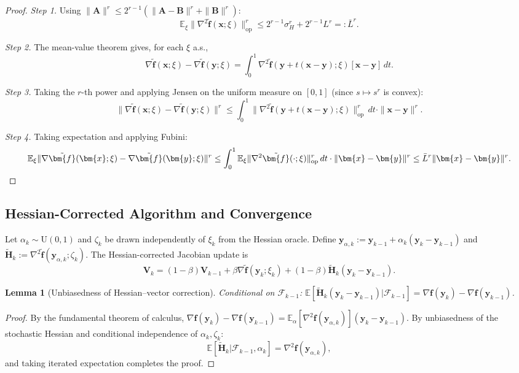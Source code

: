 \documentclass{article}
\def\vf{{\bm{f}}}
\def\vx{{\bm{x}}}
\def\vy{{\bm{y}}}
\def\vA{{\bm{A}}}
\def\vB{{\bm{B}}}
\def\mH{{\bm{H}}}
\def\mV{{\bm{V}}}
\newcommand{\E}{\mathbb{E}}
\newtheorem{lemma}{Lemma}
\begin{document}
\begin{proof}
\emph{Step 1.} Using $\|\vA\|^r \le 2^{r-1}(\|\vA - \vB\|^r + \|\vB\|^r)$:
\[
\E_\xi\|\nabla^2\tilde\vf(\vx; \xi)\|_{\mathrm{op}}^r \le 2^{r-1}\sigma_H^r + 2^{r-1} L^r =: \bar L^r.
\]

\emph{Step 2.} The mean-value theorem gives, for each $\xi$ a.s.,
\[
\nabla\tilde\vf(\vx;\xi) - \nabla\tilde\vf(\vy;\xi) = \int_0^1 \nabla^2\tilde\vf(\vy + t(\vx - \vy); \xi)[\vx - \vy]\,dt.
\]

\emph{Step 3.} Taking the $r$-th power and applying Jensen on the uniform measure on $[0,1]$ (since $s \mapsto s^r$ is convex):
\[
\|\nabla\tilde\vf(\vx;\xi) - \nabla\tilde\vf(\vy;\xi)\|^r \le \int_0^1 \|\nabla^2\tilde\vf(\vy + t(\vx - \vy); \xi)\|_{\mathrm{op}}^r\,dt \cdot \|\vx - \vy\|^r.
\]

\emph{Step 4.} Taking expectation and applying Fubini:
\[
\E_\xi\|\nabla\tilde\vf(\vx; \xi) - \nabla\tilde\vf(\vy; \xi)\|^r \le \int_0^1 \E_\xi\|\nabla^2\tilde\vf(\cdot; \xi)\|_{\mathrm{op}}^r\,dt \cdot \|\vx - \vy\|^r \le \bar L^r \|\vx - \vy\|^r.\qedhere
\]
\end{proof}

\subsection{Hessian-Corrected Algorithm and Convergence}

Let $\alpha_k \sim \mathrm{U}(0,1)$ and $\zeta_k$ be drawn independently of $\xi_k$ from the Hessian oracle. Define $\vy_{\alpha,k} := \vy_{k-1} + \alpha_k(\vy_k - \vy_{k-1})$ and $\tilde\mH_k := \nabla^2\tilde\vf(\vy_{\alpha,k}; \zeta_k)$. The Hessian-corrected Jacobian update is
\begin{equation} \label{eq:hessian_grad}
\mV_k = (1-\beta)\mV_{k-1} + \beta\nabla\tilde\vf(\vy_k; \xi_k) + (1-\beta)\tilde\mH_k(\vy_k - \vy_{k-1}).
\end{equation}

\begin{lemma}[Unbiasedness of Hessian--vector correction] \label{lem:hessian_unbiased}
Conditional on $\mathcal{F}_{k-1}$: $\E[\tilde\mH_k(\vy_k - \vy_{k-1}) | \mathcal{F}_{k-1}] = \nabla\vf(\vy_k) - \nabla\vf(\vy_{k-1})$.
\end{lemma}

\begin{proof}
By the fundamental theorem of calculus, $\nabla\vf(\vy_k) - \nabla\vf(\vy_{k-1}) = \E_\alpha[\nabla^2\vf(\vy_{\alpha,k})](\vy_k - \vy_{k-1})$. By unbiasedness of the stochastic Hessian and conditional independence of $\alpha_k, \zeta_k$:
\[
\E[\tilde\mH_k | \mathcal{F}_{k-1}, \alpha_k] = \nabla^2\vf(\vy_{\alpha,k}),
\]
and taking iterated expectation completes the proof.
\end{proof}
\end{document}
